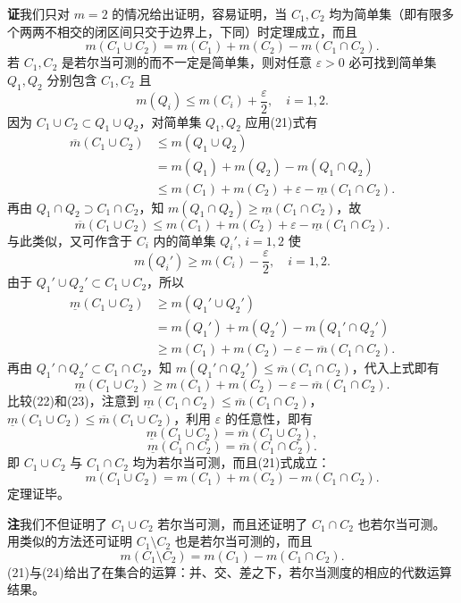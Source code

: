 \noindent\textbf{证}\quad 我们只对 $m=2$ 的情况给出证明，容易证明，当 $C_1,C_2$ 均为简单集（即有限多个两两不相交的闭区间只交于边界上，下同）时定理成立，而且
\begin{equation}
 m(C_1\cup C_2)=m(C_1)+m(C_2)-m(C_1\cap C_2).
 \tag{21}
\end{equation}
若 $C_1,C_2$ 是若尔当可测的而不一定是简单集，则对任意 $\varepsilon>0$ 必可找到简单集 $Q_1,Q_2$ 分别包含 $C_1,C_2$ 且
\[
 m(Q_i)\le m(C_i)+\frac\varepsilon2,\quad i=1,2.
\]
因为 $C_1\cup C_2\subset Q_1\cup Q_2$，对简单集 $Q_1,Q_2$ 应用(21)式有
\begin{align*}
 \overline m(C_1\cup C_2)&\le m(Q_1\cup Q_2)\\
 &=m(Q_1)+m(Q_2)-m(Q_1\cap Q_2)\\
 &\le m(C_1)+m(C_2)+\varepsilon-\underline m(C_1\cap C_2).
\end{align*}
再由 $Q_1\cap Q_2\supset C_1\cap C_2$，知 $m(Q_1\cap Q_2)\ge\underline m(C_1\cap C_2)$，故
\begin{equation}
 \overline m(C_1\cup C_2)\le m(C_1)+m(C_2)+\varepsilon-\underline m(C_1\cap C_2).
 \tag{22}
\end{equation}
与此类似，又可作含于 $C_i$ 内的简单集 $Q_i'$, $i=1,2$ 使
\[
 m(Q_i')\ge m(C_i)-\frac\varepsilon2,\quad i=1,2.
\]
由于 $Q_1'\cup Q_2'\subset C_1\cup C_2$，所以
\begin{align*}
 \underline m(C_1\cup C_2)&\ge m(Q_1'\cup Q_2')\\
 &=m(Q_1')+m(Q_2')-m(Q_1'\cap Q_2')\\
 &\ge m(C_1)+m(C_2)-\varepsilon-\overline m(C_1\cap C_2).
\end{align*}
再由 $Q_1'\cap Q_2'\subset C_1\cap C_2$，知 $m(Q_1'\cap Q_2')\le\overline m(C_1\cap C_2)$，代入上式即有
\begin{equation}
 \underline m(C_1\cup C_2)\ge m(C_1)+m(C_2)-\varepsilon-\overline m(C_1\cap C_2).
 \tag{23}
\end{equation}
比较(22)和(23)，注意到 $\underline m(C_1\cap C_2)\le\overline m(C_1\cap C_2)$，$\underline m(C_1\cup C_2)\le\overline m(C_1\cup C_2)$，利用 $\varepsilon$ 的任意性，即有
\[
 \underline m(C_1\cup C_2)=\overline m(C_1\cup C_2),
\]
\[
 \underline m(C_1\cap C_2)=\overline m(C_1\cap C_2).
\]
即 $C_1\cup C_2$ 与 $C_1\cap C_2$ 均为若尔当可测，而且(21)式成立：
\[
 m(C_1\cup C_2)=m(C_1)+m(C_2)-m(C_1\cap C_2).
\]
定理证毕。

\noindent\textbf{注}\quad 我们不但证明了 $C_1\cup C_2$ 若尔当可测，而且还证明了 $C_1\cap C_2$ 也若尔当可测。用类似的方法还可证明 $C_1\setminus C_2$ 也是若尔当可测的，而且
\begin{equation}
 m(C_1\setminus C_2)=m(C_1)-m(C_1\cap C_2).
 \tag{24}
\end{equation}
(21)与(24)给出了在集合的运算：并、交、差之下，若尔当测度的相应的代数运算结果。


